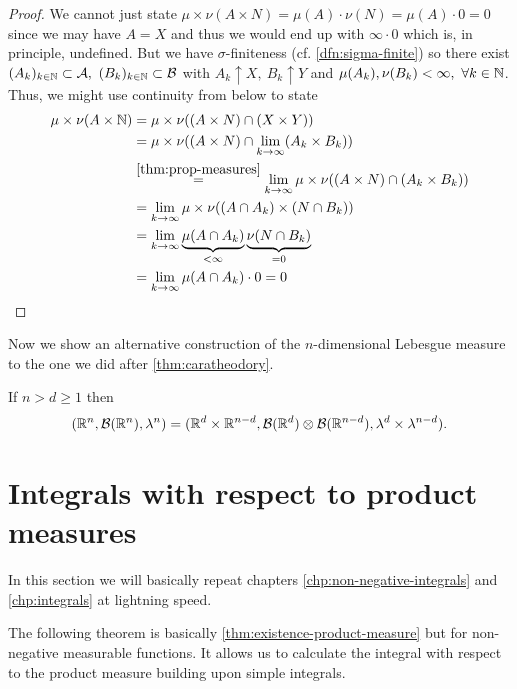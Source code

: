 \begin{proof}
	We cannot just state $\mu \times \nu(A \times N) = \mu(A) \cdot \nu(N) = \mu(A) \cdot 0 = 0$ since we may have $A = X$ and thus we would end up with $\infty \cdot 0$ which is, in principle, undefined. But we have $\sigma$-finiteness (cf. \autoref{dfn:sigma-finite}) so there exist $(A_k)_{k\in\mathbb{N}} \subset \mathcal{A},\ (B_k)_{k\in \mathbb{N}} \subset \mathcal{B}$ with $A_k \uparrow X,\ B_k \uparrow Y$ and $\mu(A_k), \nu(B_k) < \infty,\ \forall k \in \mathbb{N}$. Thus, we might use continuity from below to state
	\begin{align*}
		\mu \times \nu (A \times \mathbb{N})
		&= \mu \times \nu( (A \times N) \cap (X \times Y))\\
		&= \mu \times \nu( (A \times N) \cap \lim_{k\to\infty} (A_k \times B_k))\\
		&\overset{\ref{thm:prop-measures}}{=} \lim_{k\to\infty} \mu \times \nu ( (A \times N) \cap (A_k \times B_k))\\
		&= \lim_{k\to\infty} \mu \times \nu ( (A \cap A_k) \times (N \cap B_k))\\
		&= \lim_{k\to \infty} \underbrace{\mu (A \cap A_k)}_{< \infty} \underbrace{\nu(N \cap B_k)}_{= 0} \\
		&= \lim_{k \to \infty} \mu(A \cap A_k) \cdot 0 = 0
	\end{align*}
\end{proof}

Now we show an alternative construction of the $n$-dimensional Lebesgue measure to the one we did after \autoref{thm:caratheodory}.

\begin{cor}
	\label{cor:lebesgue-product-extension}
	If $n > d \geq 1$ then
	\begin{align*}
		(\mathbb{R}^n, \mathcal{B}(\mathbb{R}^n), \lambda^n)
		= (\mathbb{R}^d \times \mathbb{R}^{n-d}, \mathcal{B}(\mathbb{R}^d) \otimes \mathcal{B}(\mathbb{R}^{n-d}), \lambda^d \times \lambda^{n-d}).
	\end{align*}
\end{cor}

\section{Integrals with respect to product measures}

In this section we will basically repeat chapters \ref{chp:non-negative-integrals} and \ref{chp:integrals} at lightning speed.

The following theorem is basically \autoref{thm:existence-product-measure} but for non-negative measurable functions. It allows us to calculate the integral with respect to the product measure building upon simple integrals.

